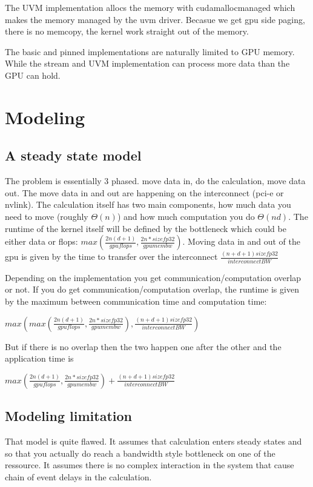 \documentclass{article}
\begin{document}
The UVM implementation allocs the memory with cudamallocmanaged which
makes the memory managed by the uvm driver. Becasue we get gpu side
paging, there is no memcopy, the kernel work straight out of the memory.

The basic and pinned implementations are naturally limited to GPU
memory. While the stream and UVM implementation can process more data
than the GPU can hold.

\section{Modeling}

\subsection{A steady state model}

The problem is essentially 3 phased. move data in, do the calculation,
move data out. The move data in and out are happening on the
interconnect (pci-e or nvlink). The calculation itself has two main
components, how much data you need to move (roughly $\Theta(n)$) and
how much computation you do $\Theta(nd)$. The runtime of the kernel
itself will be defined by the bottleneck which could be either data or
flops: $max(\frac{2n(d+1)}{gpuflops},
\frac{2n*sizefp32}{gpumembw})$. Moving data in and out of the gpu is
given by the time to transfer over the interconnect
$\frac{(n+d+1)sizefp32}{interconnectBW}$

Depending on the implementation you get communication/computation
overlap or not. If you do get communication/computation overlap, the
runtime is given by the maximum between communication time and computation time:

$max(max(\frac{2n(d+1)}{gpuflops}, \frac{2n*sizefp32}{gpumembw}),\frac{(n+d+1)sizefp32}{interconnectBW})$

But if there is no overlap then the two happen one after the other and
the application time is

$max(\frac{2n(d+1)}{gpuflops}, \frac{2n*sizefp32}{gpumembw}) +
\frac{(n+d+1)sizefp32}{interconnectBW}$

\subsection{Modeling limitation}

That model is quite flawed. It assumes that calculation enters steady
states and so that you actually do reach a bandwidth style bottleneck
on one of the ressource.  It assumes there is no complex interaction
in the system that cause chain of event delays in the calculation.
\end{document}
